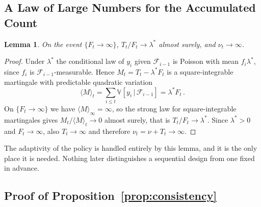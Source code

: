 \documentclass[twoside]{article}
\newcommand\given[1][]{\,#1\vert\,}
\providecommand{\Var}[2]{\mathbb{V}_{#1}\!\left[#2\right]}
\theoremstyle{plain}
\newtheorem{lemma}{Lemma}
\theoremstyle{definition}
\theoremstyle{remark}
\begin{document}
\subsection{A Law of Large Numbers for the Accumulated Count}

\begin{lemma}
    \label{lem:lln}
    On the event $\{F_t \to \infty\}$, $T_t / F_t \to \lambda^{*}$ almost surely, and $\nu_t \to \infty$.
\end{lemma}

\begin{proof}
    Under $\lambda^{*}$ the conditional law of $y_i$ given $\mathcal{F}_{i - 1}$ is Poisson with mean $f_i \lambda^{*}$, since $f_i$ is $\mathcal{F}_{i-1}$-measurable.
    Hence $M_t = T_t - \lambda^{*} F_t$ is a square-integrable martingale with predictable quadratic variation
    \begin{equation*}
        \langle M \rangle_t = \sum_{i \leq t} \Var{}{y_i \given \mathcal{F}_{i-1}} = \lambda^{*} F_t \,.
    \end{equation*}
    On $\{F_t \to \infty\}$ we have $\langle M \rangle_{\infty} = \infty$, so the strong law for square-integrable martingales gives $M_t / \langle M \rangle_t \to 0$ almost surely, that is $T_t / F_t \to \lambda^{*}$.
    Since $\lambda^{*} > 0$ and $F_t \to \infty$, also $T_t \to \infty$ and therefore $\nu_t = \nu + T_t \to \infty$.
\end{proof}

The adaptivity of the policy is handled entirely by this lemma, and it is the only place it is needed.
Nothing later distinguishes a sequential design from one fixed in advance.

\subsection{Proof of Proposition~\ref{prop:consistency}}
\end{document}
